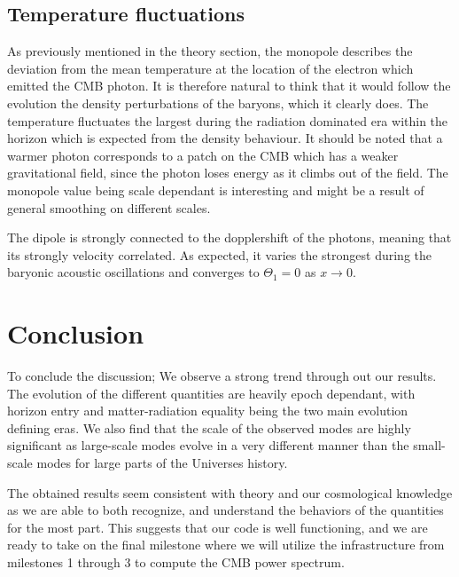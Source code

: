 \documentclass[a4paper, 10pt, reqno]{amsart}
\begin{document}
\subsection{Temperature fluctuations}
As previously mentioned in the theory section, the monopole describes the deviation from the mean temperature at the location of the electron which emitted the CMB photon. It is therefore natural to think that it would follow the evolution the density perturbations of the baryons, which it clearly does. The temperature fluctuates the largest during the radiation dominated era within the horizon which is expected from the density behaviour. It should be noted that a warmer photon corresponds to a patch on the CMB which has a weaker gravitational field, since the photon loses energy as it climbs out of the field. The monopole value being scale dependant is interesting and might be a result of general smoothing on different scales.

The dipole is strongly connected to the dopplershift of the photons, meaning that its strongly velocity correlated. As expected, it varies the strongest during the baryonic acoustic oscillations and converges to $\Theta_1 = 0 $ as $ x \rightarrow 0$.

\section{Conclusion}
To conclude the discussion; We observe a strong trend through out our results. The evolution of the different quantities are heavily epoch dependant, with horizon entry and matter-radiation equality being the two main evolution defining eras. We also find that the scale of the observed modes are highly significant as large-scale modes evolve in a very different manner than the small-scale modes for large parts of the Universes history.

The obtained results seem consistent with theory and our cosmological knowledge as we are able to both recognize, and understand the behaviors of the quantities for the most part. This suggests that our code is well functioning, and we are ready to take on the final milestone where we will utilize the infrastructure from milestones 1 through 3 to compute the CMB power spectrum.



\nocite{*}
{}

\end{document}
